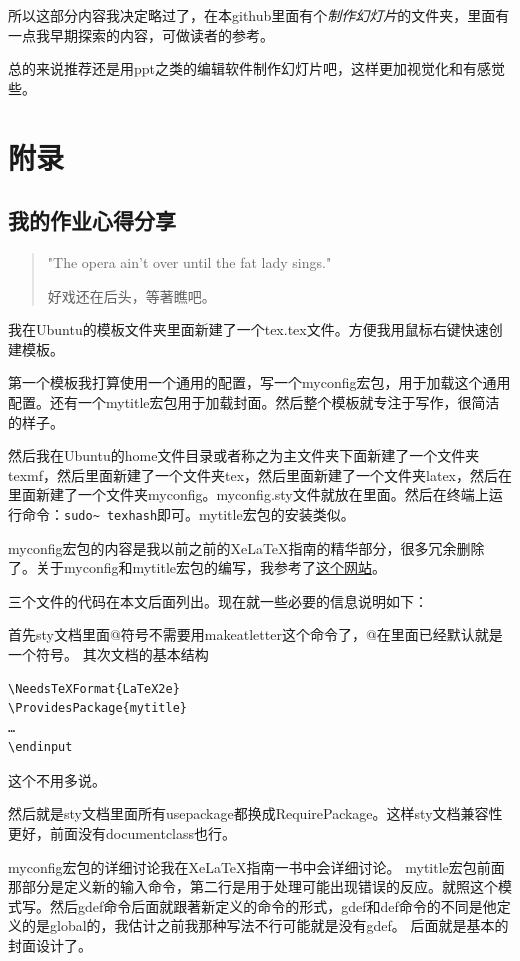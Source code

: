 \documentclass[11pt,oneside]{book}
\begin{document}
所以这部分内容我决定略过了，在本github里面有个\textit{制作幻灯片}的文件夹，里面有一点我早期探索的内容，可做读者的参考。

总的来说推荐还是用ppt之类的编辑软件制作幻灯片吧，这样更加视觉化和有感觉些。








\appendix
\part{附录}
\chapter{我的作业心得分享}
\begin{quotation}
"The opera ain't over until the fat lady sings."

好戏还在后头，等著瞧吧。
\end{quotation}

我在Ubuntu的模板文件夹里面新建了一个tex.tex文件。方便我用鼠标右键快速创建模板。

第一个模板我打算使用一个通用的配置，写一个myconfig宏包，用于加载这个通用配置。还有一个mytitle宏包用于加载封面。然后整个模板就专注于写作，很简洁的样子。

然后我在Ubuntu的home文件目录或者称之为主文件夹下面新建了一个文件夹texmf，然后里面新建了一个文件夹tex，然后里面新建了一个文件夹latex，然后在里面新建了一个文件夹myconfig。myconfig.sty文件就放在里面。然后在终端上运行命令：\verb+sudo~ texhash+即可。mytitle宏包的安装类似。

myconfig宏包的内容是我以前之前的XeLaTeX指南的精华部分，很多冗余删除了。关于myconfig和mytitle宏包的编写，我参考了\href{http://tex.stackexchange.com/questions/70166/create-a-function-that-generates-a-title-page}{这个网站}。

三个文件的代码在本文后面列出。现在就一些必要的信息说明如下：

首先sty文档里面@符号不需要用makeatletter这个命令了，@在里面已经默认就是一个符号。
其次文档的基本结构
\begin{Verbatim}
\NeedsTeXFormat{LaTeX2e}
\ProvidesPackage{mytitle}
…
\endinput
\end{Verbatim}
这个不用多说。

然后就是sty文档里面所有usepackage都换成RequirePackage。这样sty文档兼容性更好，前面没有documentclass也行。

myconfig宏包的详细讨论我在XeLaTeX指南一书中会详细讨论。
mytitle宏包前面那部分是定义新的输入命令，第二行是用于处理可能出现错误的反应。就照这个模式写。然后gdef命令后面就跟著新定义的命令的形式，gdef和def命令的不同是他定义的是global的，我估计之前我那种写法不行可能就是没有gdef。
后面就是基本的封面设计了。
\end{document}
